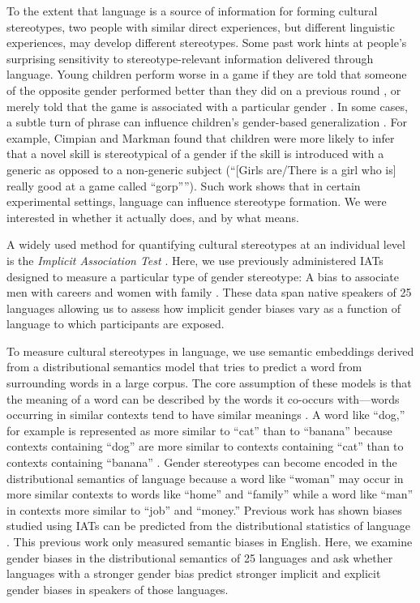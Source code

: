 \documentclass[9pt,twocolumn,twoside]{pnas-new}
\begin{document}
To the extent that language is a source of information for forming
cultural stereotypes, two people with similar direct experiences, but
different linguistic experiences, may develop different stereotypes.
Some past work hints at people's surprising sensitivity to
stereotype-relevant information delivered through language. Young
children perform worse in a game if they are told that someone of the
opposite gender performed better than they did on a previous round
\cite{rhodes2008preschoolers}, or merely told that the game is associated
with a particular gender \cite{cimpian2012good}. In some
cases, a subtle turn of phrase can influence children's gender-based
generalization \cite{cimpian2011generic,rhodes2018subtle}. For example, Cimpian and Markman found that children were more likely to infer that a novel skill is stereotypical of a
gender if the skill is introduced with a generic as opposed to a
non-generic subject (``{[}Girls are/There is a girl who is{]} really
good at a game called ``gorp''''). Such work shows that in certain
experimental settings, language can influence stereotype formation. We
were interested in whether it actually does, and by what means.

A widely used method for quantifying cultural stereotypes at an
individual level is the \emph{Implicit Association Test} \citep[IAT,][]{greenwald1998measuring}. Here, we use previously administered IATs designed to measure a particular type of gender
stereotype: A bias to associate men with careers and women with family
\cite[\emph{N} = 657,335]{nosek2002harvesting}. These data span native
speakers of 25 languages allowing us to assess how implicit gender biases vary as a function of language to which participants are exposed. 

To measure cultural stereotypes in language, we use semantic embeddings derived from a distributional semantics model that tries to predict a word from surrounding words in a large corpus. The core assumption of these models is that the meaning of a word can be described by the words it co-occurs with---words occurring in similar contexts tend to have similar meanings \cite{firth1957synopsis}. A word like \enquote{dog,} for example is represented as more similar to \enquote{cat} than to \enquote{banana} because contexts containing \enquote{dog} are more similar to contexts containing \enquote{cat} than to contexts containing \enquote{banana} \cite{landauer1997solution,lund1996producing,lenci2008distributional}. Gender stereotypes can become encoded in the distributional semantics of language because a word like \enquote{woman} may occur in more similar contexts to words like \enquote{home} and \enquote{family} while a word like \enquote{man} in contexts more similar to \enquote{job} and \enquote{money.} Previous work has shown biases studied using IATs can be predicted from the distributional statistics of language \citep[word co-occurrences,][]{caliskan2017semantics}. This previous work only measured semantic biases in English. Here, we examine gender biases in the distributional semantics of 25 languages and ask whether languages with a stronger gender bias predict stronger implicit and explicit gender biases in speakers of those languages.
\end{document}
